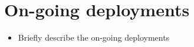 \section{On-going deployments}
\label{sec:deployments}

\begin{itemize}
    \item Briefly describe the on-going deployments
\end{itemize}